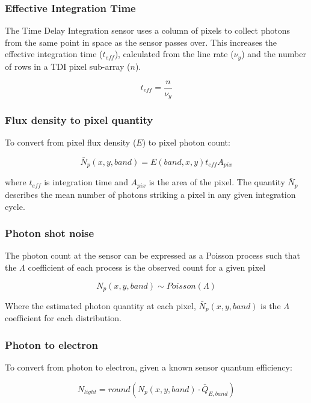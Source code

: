 \documentclass[10pt,a4paper,final,onecolumn]{article}
\begin{document}
\subsubsection{Effective Integration Time}
The Time Delay Integration sensor uses a column of pixels to collect photons from the same point in space as the sensor passes over. This increases the effective integration time ($t_{eff}$), calculated from the line rate ($\nu_{y}$) and the number of rows in a TDI pixel sub-array ($n$).

\begin{equation}
t_{eff} = \frac{n}{\nu_{y}}
\end{equation}

\subsubsection{Flux density to pixel quantity}
To convert from pixel flux density ($E$) to pixel photon count:

\begin{equation}
\bar{N}_{p}(x, y, band) =  E(band, x, y) t_{eff} A_{pix}
\end{equation}

where $t_{eff}$ is integration time and $A_{pix}$ is the area of the pixel. The quantity $\bar{N}_{p} $  describes the mean number of photons striking a pixel in any given integration cycle.

\subsubsection{Photon shot noise}
The photon count at the sensor can be expressed as a Poisson process such that the $\Lambda$ coefficient of each process is the observed count for a given pixel

\begin{equation}
N_{p}(x, y, band) \sim Poisson(\Lambda)
\end{equation}

Where the estimated photon quantity at each pixel, $\bar{N}_{p}(x, y, band) $ is the $\Lambda$ coefficient for each distribution.

\subsubsection{Photon to electron}
To convert from photon to electron, given a known sensor quantum efficiency:

\begin{equation}
N_{light}=  round(N_{p}(x, y, band) \cdot \bar{Q}_{E,band})
\end{equation}
\end{document}
